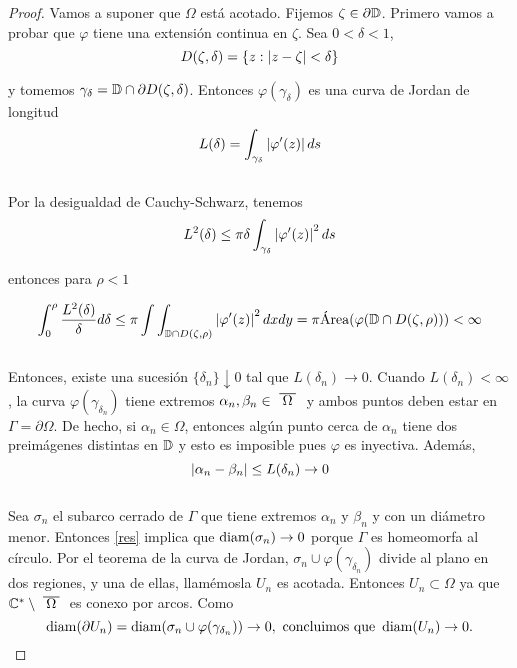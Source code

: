 \begin{proof}
    Vamos a suponer que $\Omega$ está acotado. Fijemos $\zeta \in \partial \mathbb{D}$. Primero vamos a probar que $\varphi$ tiene una extensión continua en $\zeta$. Sea $0 < \delta < 1$,
    \begin{equation*}
        D(\zeta, \delta) = \{z: \left\lvert z - \zeta\right\rvert < \delta \}
    \end{equation*}

    y tomemos $\gamma_{\delta} = \mathbb{D} \cap \partial D(\zeta, \delta)$. Entonces $\varphi (\gamma_{\delta})$ es una curva de Jordan de longitud
    \begin{equation*}
        L(\delta) = \int_{\gamma_{\delta}} \left\lvert\varphi ' (z)\right\rvert ds
    \end{equation*}
    \\
    Por la desigualdad de Cauchy-Schwarz, tenemos
    \begin{equation*}
        L^2(\delta) \leq \pi \delta \int_{\gamma_{\delta}} \left\lvert\varphi ' (z)\right\rvert^2 ds
    \end{equation*}

    entonces para $\rho < 1$

    \begin{equation*}
        \int_{0}^{\rho} \frac{L^2(\delta)}{\delta} d\delta \leq \pi \int \int_{\mathbb{D} \cap D(\zeta, \rho)} \left\lvert\varphi ' (z)\right\rvert^2 dxdy = \pi \text{Área}(\varphi(\mathbb{D} \cap D(\zeta, \rho))) < \infty
    \end{equation*}
    \\
    Entonces, existe una sucesión $\{ \delta_n\} \downarrow 0$ tal que $L(\delta_n) \rightarrow 0$. Cuando $L(\delta_n) < \infty$, la curva $\varphi(\gamma_{\delta_n})$ tiene extremos $\alpha_n, \beta_n \in \xbar{\Omega}$ y ambos puntos deben estar en $\Gamma = \partial \Omega$. De hecho, si $\alpha_n \in \Omega$, entonces algún punto cerca de $\alpha_n$ tiene dos preimágenes distintas en $\mathbb{D}$ y esto es imposible pues $\varphi$ es inyectiva. Además,
    \begin{equation}\label{res}
        \left\lvert\alpha_n - \beta_n\right\rvert \leq L(\delta_n) \rightarrow 0
    \end{equation}
    \\
    Sea $\sigma_n$ el subarco cerrado de $\Gamma$ que tiene extremos $\alpha_n$ y $\beta_n$ y con un diámetro menor. Entonces \ref{res} implica que $\operatorname{diam}(\sigma_n) \rightarrow 0$ porque $\Gamma$ es homeomorfa al círculo. Por el teorema de la curva de Jordan, $\sigma_n \cup \varphi(\gamma_{\delta_n})$ divide al plano en dos regiones, y una de ellas, llamémosla $U_n$ es acotada. Entonces $U_n \subset \Omega$ ya que $\complex^* \setminus \xbar{\Omega}$ es conexo por arcos. Como
    \begin{equation}
        \label{res2}
        \operatorname{diam}(\partial U_n) = \operatorname{diam}(\sigma_n \cup \varphi(\gamma_{\delta_n})) \rightarrow 0,
        \text{ concluimos que }
        \operatorname{diam}(U_n) \rightarrow 0.
    \end{equation}


\end{proof}
